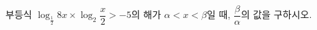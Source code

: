 부등식 $\log_{\frac{1}{2}} 8x\times\log_2\dfrac{x}{2}>-5$의 해가 $\alpha<x<\beta$일 때, $\dfrac{\beta}{\alpha}$의 값을 구하시오.
